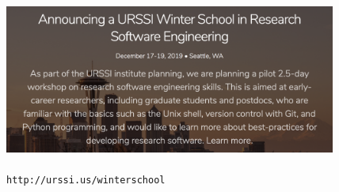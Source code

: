 \documentclass[default,compress]{beamer}
\begin{document}
\begin{frame}[plain]
    \begin{center}
        \includegraphics[height=4.9cm]{URSSI_winter_school.png}
        \\~\\
        \texttt{http://urssi.us/winterschool}
    \end{center}
\end{frame}
\end{document}
